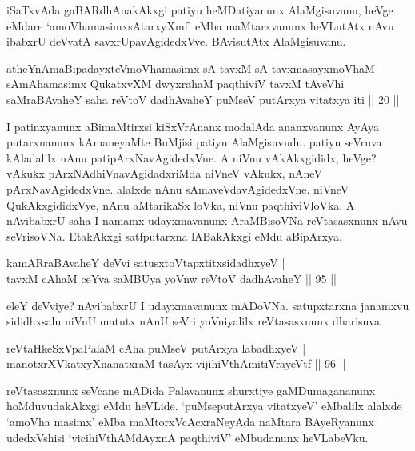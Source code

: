 \begin{artha}
iSaTxvAda gaBARdhAnakAkxgi patiyu heMDatiyanunx AlaMgisuvanu, heVge 
eMdare `amoVhamasimxsAtarxyXmf' eMba maMtarxvanunx heVLutAtx nAvu 
ibabxrU deVvatA savxrUpavAgidedxVve. BAvisutAtx AlaMgisuvanu.
\end{artha}


\begin{shl}
atheYnAmaBipadayxteV\s moV\s hamasimx sA tavxM sA tavxmasayxmoV\s haM sAmAhamasimx QukatxvXM dwyxrahaM paqthiviV tavxM tAveVhi saMraBAvaheY saha reVtoV dadhAvaheY puMseV putArxya vitatxya iti || 20 ||
\end{shl}


\begin{artha}
I patinxyanunx aBimaMtirxsi kiSxVrAnanx modalAda ananxvanunx AyAya 
putarxnanunx kAmaneyaMte BuMjisi patiyu AlaMgisuvudu. patiyu seVruva 
kAladalilx nAnu patipArxNavAgidedxVne. A niVnu vAkAkxgididx, heVge? 
vAkukx pArxNAdhiVnavAgidadxriMda niVneV vAkukx, nAneV 
pArxNavAgidedxVne. alalxde nAnu sAmaveVdavAgidedxVne. niVneV 
QukAkxgididxVye, nAnu aMtarikaSx loVka, niVnu paqthiviVloVka. A 
nAvibabxrU saha I namamx udayxmavanunx AraMBisoVNa reVtasasxnunx nAvu 
seVrisoVNa. EtakAkxgi satfputarxna lABakAkxgi eMdu aBipArxya.
\end{artha}

\begin{shl}
kamAR\s \s raBAvaheY deVvi satusxtoVtapxtitxsidadhxyeV | \\
tavxM cAhaM ceYva saMBUya yoVnw reVtoV dadhAvaheY \hfill|| 95 || 
\end{shl}
	
\begin{artha}
eleY deVviye? nAvibabxrU I udayxmavanunx mADoVNa. satupxtarxna 
janamxvu sididhxsalu niVnU matutx nAnU seVri yoVniyalilx reVtasasxnunx 
dharisuva.
\end{artha}

\begin{shl}
reVtaHkeSxVpaPalaM cA\s \s ha puMseV putArxya labadhxyeV | \\
manotxrXVkatxyXnanatxraM tasAyx vijihiVthAmitiVrayeVtf \hfill|| 96 || 
\end{shl}

\begin{artha}
reVtasasxnunx seVcane mADida Palavanunx shurxtiye gaMDumagananunx 
hoMduvuda\-kAkxgi eMdu heVLide. `puMseputArxya vitatxyeV' eMbalilx 
alalxde `amoV\s ha masimx' eMba maMtorxVcAcxraNeyAda naMtara 
BAyeRyanunx udedxVshisi `vicihiVthAM\-dAyxnA paqthiviV' eMbudanunx 
heVLabeVku.
\end{artha}

